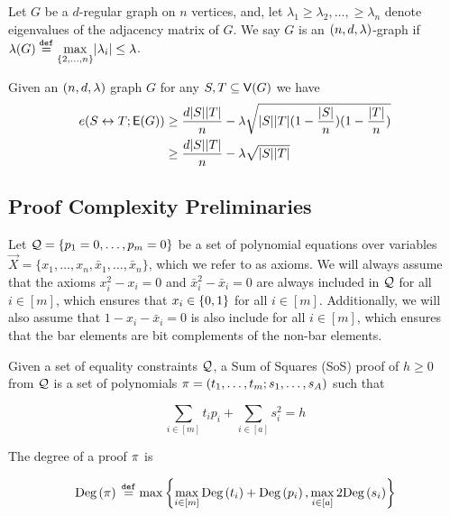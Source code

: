 \documentclass[11pt]{article}
\begin{document}
\begin{definition}\label{def:expander-graphs}
Let $G$ be a $d$-regular graph on $n$ vertices, and, let $\lambda_1 \geq \lambda_2, \dots, \geq \lambda_n$ denote eigenvalues of the adjacency matrix of $G$.
We say $G$ is an $(n, d, \lambda)$-graph if $\lambda(G) \text{}\overset{\mathtt{def}}{=} \underset{{\{2, \dots, n\}}}{\max}|\lambda_i| \leq \lambda$.
\end{definition}


\begin{lemma}\label{lemma:expanders-mixing-lemma}
  Given an $(n, d, \lambda)$ graph $G$ for any $S, T \subseteq \mathsf{V}(G)$ we have
\begin{align*}
  e(S \leftrightarrow T; \mathsf{E}(G)) &\geq \frac{d|S||T|}{n} - \lambda\sqrt{|S||T| (1 - \frac{|S|}{n}) (1 - \frac{|T|}{n})   }	\\
  &\geq \frac{d|S||T|}{n} - \lambda\sqrt{|S||T| }
\end{align*}
  
\end{lemma}





\subsection{Proof Complexity Preliminaries}
\label{sec:proof-system-prelims}

Let $\mathcal{Q} = \{ p_1 = 0, \dots, p_m = 0\}$ be a set of polynomial equations over variables $\vec{X} = \{x_1, \dots, x_n, \bar{x}_1, \dots, \bar{x}_n\}$, which we refer to as axioms.
We will always assume that the axioms $x_i^2 - x_i = 0$ and $\bar{x}_i^2 - \bar{x}_i = 0$ are always included in $\mathcal{Q}$ for all $i \in [m]$, which ensures that $x_i \in \{0,1\}$ for all $i\in [m]$.
Additionally, we will also assume that $1 - x_i - \bar{x}_i=0$ is also include for all $i \in [m]$, which ensures that the bar elements are bit complements of the non-bar elements.

\begin{definition}\label{def:sum-of-squares} Given a set of equality constraints $\mathcal{Q}$, a Sum of Squares (SoS) proof of $h \geq 0$ from $\mathcal{Q}$ is a set of polynomials $\pi = (t_1, \dots, t_m; s_1, \dots, s_A)$ such that 

\[ \sum_{i \in [m]} t_ip_i+ \sum_{i \in [a]} s_i^2 = h\]

The degree of a proof $\pi$ is 

\[ \text{Deg}\left(\pi\right) \text{}\overset{\mathtt{def}}{=} \max\left\{\max_{i \in [m]} \text{Deg}\left(t_i\right) + \text{Deg}\left(p_i\right), \max_{i \in [a]} 2\text{Deg}\left(s_i\right)\right\}\]	


\end{definition}
\end{document}
